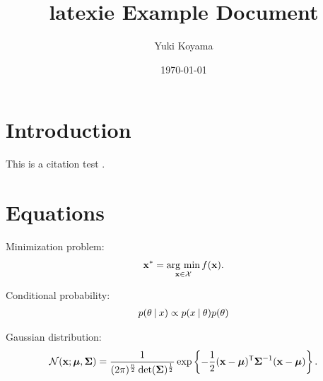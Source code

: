 \documentclass[]{latexie-article}
\title{latexie Example Document}
\author{Yuki Koyama}
\date{\today}
\begin{document}
\maketitle

\begin{abstract}
  \lipsum[1-2]
\end{abstract}

\tableofcontents

\section{Introduction}

This is a citation test \cite{Koyama:SIGGRAPH:17, Koyama:SIGGRAPH:20, Koyama:CHI:18}.

\lipsum[1-5]

\section{Equations}

Minimization problem:
\begin{align}
  \mathbf{x}^{*} = \operatorname*{arg~min}_{\mathbf{x} \in \mathcal{X}} f(\mathbf{x}).
\end{align}

Conditional probability:
\begin{align}
  \cprob{\theta}{x} \propto \cprob{x}{\theta}\prob{\theta}
\end{align}

Gaussian distribution:
\begin{align}
  \mathcal{N}(\mathbf{x}; \boldsymbol{\mu}, \boldsymbol{\Sigma})
  =
  \frac{1}{(2 \pi)^{\frac{n}{2}} \det(\boldsymbol{\Sigma})^{\frac{1}{2}}}
  \exp \left\{
    - \frac{1}{2} (\mathbf{x} - \boldsymbol{\mu})^{\mathsf{T}} \boldsymbol{\Sigma}^{-1} (\mathbf{x} - \boldsymbol{\mu})
  \right\}.
\end{align}



\end{document}
